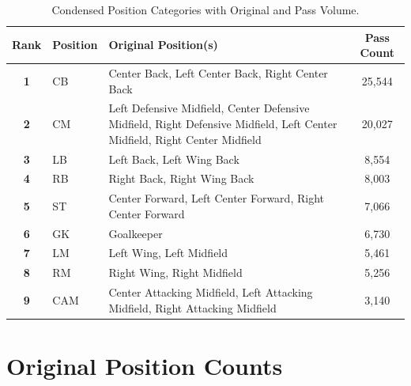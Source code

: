 \documentclass[12pt, a4paper]{article}
\begin{document}
\begin{table}[htbp]
    \centering
    \scriptsize
    \caption{Condensed Position Categories with Original and Pass Volume.}
    \label{tab:condensed_positions_mapped}
    \begin{tabularx}{\textwidth}{c l X c}
        \toprule
        \textbf{Rank} & \textbf{Position} & \textbf{Original Position(s)} & \textbf{Pass Count} \\
        \midrule
        \textbf{1} & CB & Center Back, Left Center Back, Right Center Back & 25,544 \\
        \addlinespace[3pt]
        \textbf{2} & CM & Left Defensive Midfield, Center Defensive Midfield, Right Defensive Midfield, Left Center Midfield, Right Center Midfield & 20,027 \\
        \addlinespace[3pt]
        \textbf{3} & LB & Left Back, Left Wing Back & 8,554 \\
        \addlinespace[3pt]
        \textbf{4} & RB & Right Back, Right Wing Back & 8,003 \\
        \addlinespace[3pt]
        \textbf{5} & ST & Center Forward, Left Center Forward, Right Center Forward & 7,066 \\
        \addlinespace[3pt]
        \textbf{6} & GK & Goalkeeper & 6,730 \\
        \addlinespace[3pt]
        \textbf{7} & LM & Left Wing, Left Midfield & 5,461 \\
        \addlinespace[3pt]
        \textbf{8} & RM & Right Wing, Right Midfield & 5,256 \\
        \addlinespace[3pt]
        \textbf{9} & CAM & Center Attacking Midfield, Left Attacking Midfield, Right Attacking Midfield & 3,140 \\
        \bottomrule
    \end{tabularx}
\end{table}

\clearpage
\section{Original Position Counts}
\label{app:pos_count}
\end{document}
